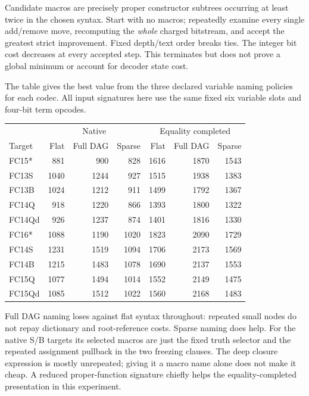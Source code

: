 Candidate macros are precisely proper constructor subtrees occurring at least
twice in the chosen syntax.  Start with no macros; repeatedly examine every
single add/remove move, recomputing the \emph{whole} charged bitstream, and
accept the greatest strict improvement.  Fixed depth/text order breaks ties.
The integer bit cost decreases at every accepted step.  This terminates but
does not prove a global minimum or account for decoder state cost.

The table gives the best value from the three declared variable naming
policies for each codec.  All input signatures here use the same fixed six
variable slots and four-bit term opcodes.
\begin{center}
\begin{tabular}{lrrrrrr}
\toprule
&\multicolumn{3}{c}{Native}&\multicolumn{3}{c}{Equality completed}\\
Target & Flat & Full DAG & Sparse & Flat & Full DAG & Sparse\\
\midrule
FC15* &881&900&828&1616&1870&1543\\
FC13S &1040&1244&927&1515&1938&1383\\
FC13B &1024&1212&911&1499&1792&1367\\
FC14Q &918&1220&866&1393&1800&1322\\
FC14Qd&926&1237&874&1401&1816&1330\\
\midrule
FC16* &1088&1190&1020&1823&2090&1729\\
FC14S &1231&1519&1094&1706&2173&1569\\
FC14B &1215&1483&1078&1690&2137&1553\\
FC15Q &1077&1494&1014&1552&2149&1475\\
FC15Qd&1085&1512&1022&1560&2168&1483\\
\bottomrule
\end{tabular}
\end{center}
Full DAG naming loses against flat syntax throughout: repeated small nodes
do not repay dictionary and root-reference costs.  Sparse naming does help.
For the native S/B targets its selected macros are just the fixed truth
selector and the repeated assignment pullback in the two freezing clauses.
The deep closure expression is mostly unrepeated; giving it a macro name
alone does not make it cheap.  A reduced proper-function signature chiefly
helps the equality-completed presentation in this experiment.

